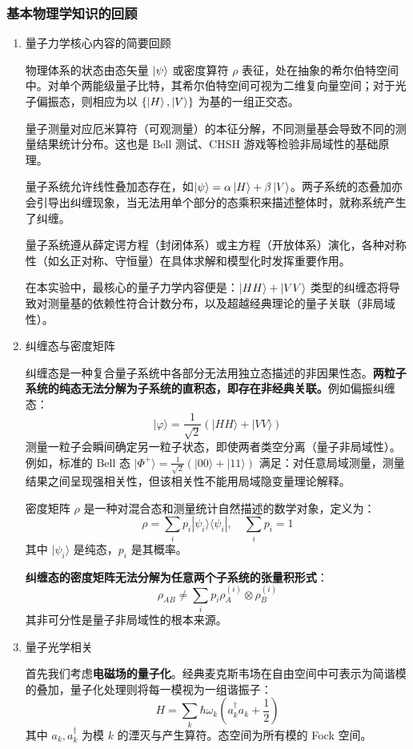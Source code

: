 \subsubsection{基本物理学知识的回顾}
\begin{enumerate}
	\item 量子力学核心内容的简要回顾
	
	物理体系的状态由态矢量 \(\ket{\psi}\) 或密度算符 \(\rho\) 表征，处在抽象的希尔伯特空间中。对单个两能级量子比特，其希尔伯特空间可视为二维复向量空间；对于光子偏振态，则相应为以 \(\{\ket{H},\ket{V}\}\) 为基的一组正交态。
	
	量子测量对应厄米算符（可观测量）的本征分解，不同测量基会导致不同的测量结果统计分布。这也是 Bell 测试、CHSH 游戏等检验非局域性的基础原理。
	
	量子系统允许线性叠加态存在，如\(\ket{\psi} = \alpha\ket{H} + \beta\ket{V}\)。两子系统的态叠加亦会引导出纠缠现象，当无法用单个部分的态乘积来描述整体时，就称系统产生了纠缠。
	
	量子系统遵从薛定谔方程（封闭体系）或主方程（开放体系）演化，各种对称性（如幺正对称、守恒量）在具体求解和模型化时发挥重要作用。
	
	在本实验中，最核心的量子力学内容便是：\(\ket{HH} + \ket{VV}\) 类型的纠缠态将导致对测量基的依赖性符合计数分布，以及超越经典理论的量子关联（非局域性）。
	
	\item 纠缠态与密度矩阵
	
	纠缠态是一种复合量子系统中各部分无法用独立态描述的非因果性态。\textbf{两粒子系统的纯态无法分解为子系统的直积态，即存在非经典关联。}例如偏振纠缠态：
	\[
	|\varphi\rangle = \frac{1}{\sqrt{2}}(|HH\rangle + |VV\rangle)
	\]
	测量一粒子会瞬间确定另一粒子状态，即使两者类空分离（量子非局域性）。例如，标准的 Bell 态 \(|\Phi^+\rangle = \frac{1}{\sqrt{2}}(|00\rangle + |11\rangle)\) 满足：对任意局域测量，测量结果之间呈现强相关性，但该相关性不能用局域隐变量理论解释。
	
	密度矩阵 \(\rho\) 是一种对混合态和测量统计自然描述的数学对象，定义为：
	\[ \rho = \sum_i p_i |\psi_i\rangle\langle \psi_i|, \quad \sum_i p_i = 1 \]
	其中 \(|\psi_i\rangle\) 是纯态，\(p_i\) 是其概率。
	
	\textbf{纠缠态的密度矩阵无法分解为任意两个子系统的张量积形式}：
	\[ \rho_{AB} \neq \sum_i p_i \rho_A^{(i)} \otimes \rho_B^{(i)} \]
	其非可分性是量子非局域性的根本来源。
	
	\item 量子光学相关
	
	首先我们考虑\textbf{电磁场的量子化}。经典麦克斯韦场在自由空间中可表示为简谐模的叠加，量子化处理则将每一模视为一组谐振子：
	\[ H = \sum_k \hbar \omega_k \left(a_k^\dagger a_k + \frac{1}{2}\right) \]
	其中 \(a_k, a_k^\dagger\) 为模 \(k\) 的湮灭与产生算符。态空间为所有模的 Fock 空间。
	

\end{enumerate}
